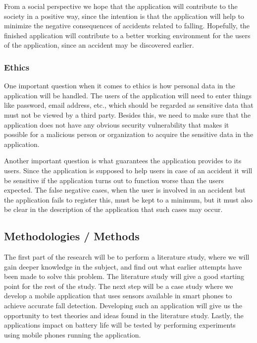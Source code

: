\documentclass[12pt, a4paper, onecolumn]{article}
\begin{document}
		From a social perspective we hope that the application will contribute to the society in a positive way, since the intention is that the application will help to minimize the negative consequences of accidents related to falling. Hopefully, the finished application will contribute to a better working environment for the users of the application, since an accident may be discovered earlier.  
		
		\subsubsection{Ethics}
		
		One important question when it comes to ethics is how personal data in the application will be handled. The users of the application will need to enter things like password, email address, etc., which should be regarded as sensitive data that must not be viewed by a third party. Besides this, we need to make sure that the application does not have any obvious security vulnerability that makes it possible for a malicious person or organization to acquire the sensitive data in the application.
		
		Another important question is what guarantees the application provides to its users. Since the application is supposed to help users in case of an accident it will be sensitive if the application turns out to function worse than the users expected. The false negative cases, when the user is involved in an accident but the application fails to register this, must be kept to a minimum, but it must also be clear in the description of the application that such cases may occur.
			
		\subsection{Methodologies / Methods}
		
		The first part of the research will be to perform a literature study, where we will gain deeper knowledge in the subject, and find out what earlier attempts have been made to solve this problem. The literature study will give a good starting point for the rest of the study. The next step will be a case study where we develop a mobile application that uses sensors available in smart phones to achieve accurate fall detection. Developing such an application will give us the opportunity to test theories and ideas found in the literature study. Lastly, the applications impact on battery life will be tested by performing experiments using mobile phones running the application.
		
\end{document}
